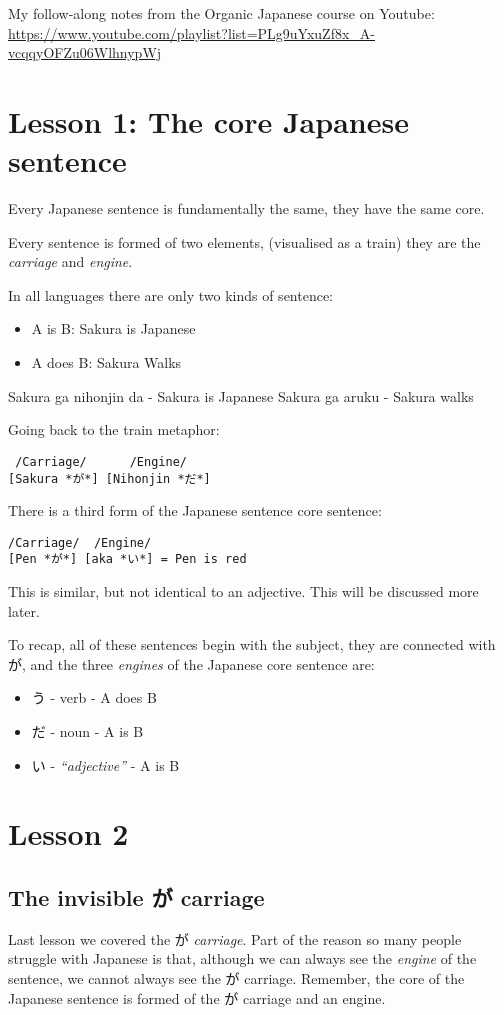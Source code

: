 \documentclass[11pt]{article}
\author{Jordan King}
\date{\today}
\title{}
\begin{document}
\tableofcontents

My follow-along notes from the Organic Japanese course on Youtube: \url{https://www.youtube.com/playlist?list=PLg9uYxuZf8x\_A-vcqqyOFZu06WlhnypWj}
\section{Lesson 1: The core Japanese sentence}
\label{sec:org4a091bb}
Every Japanese sentence is fundamentally the same, they have the same core.

Every sentence is formed of two elements, (visualised as a train) they are the \emph{carriage} and \emph{engine}.

In all languages there are only two kinds of sentence:
\begin{itemize}
\item A is B: Sakura is Japanese
\item A does B: Sakura Walks
\end{itemize}

Sakura ga nihonjin da - Sakura is Japanese
Sakura ga aruku - Sakura walks

Going back to the train metaphor:
\begin{verbatim}
 /Carriage/      /Engine/
[Sakura *が*] [Nihonjin *だ*]
\end{verbatim}

There is a third form of the Japanese sentence core sentence:
\begin{verbatim}
/Carriage/  /Engine/
[Pen *が*] [aka *い*] = Pen is red
\end{verbatim}

This is similar, but not identical to an adjective. This will be discussed more later.

To recap, all of these sentences begin with the subject, they are connected with が, and the three \emph{engines} of the Japanese core sentence are:
\begin{itemize}
\item う - verb          - A does B
\item だ - noun          - A is B
\item い - \emph{``adjective''} - A is B
\end{itemize}

\section{Lesson 2}
\label{sec:org585b699}
\subsection{The invisible が carriage}
\label{sec:org5ebcd7b}
Last lesson we covered the が \emph{carriage}. Part of the reason so many people struggle with Japanese is that, although we can always see the \emph{engine} of the sentence, we cannot always see the が carriage. Remember, the core of the Japanese sentence is formed of the が carriage and an engine.
\end{document}
